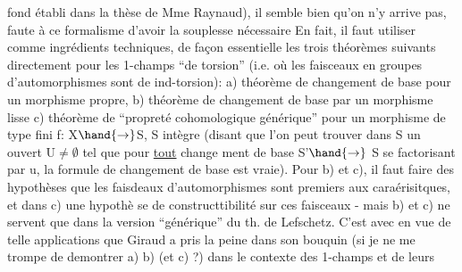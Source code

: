 fond établi dans la thèse de Mme Raynaud), il semble bien qu'on n'y arrive
 pas, faute  à ce formalisme d'avoir la souplesse nécessaire
En fait, il faut utiliser comme ingrédients techniques, de façon essentielle\hand{,}
les trois théorèmes suivants directement pour les 1-champs ``de torsion''
(i.e. où les faisceaux en groupes d'automorphismes sont de ind-torsion):
a) théorème de changement de base pour un morphisme propre, b) théorème de
changement de base par un morphisme lisse  c) théorème de  ``propreté
cohomologique générique'' pour un morphisme de type fini f: X$\hand{\to}$S, S intègre
(disant que l'on peut trouver dans S un ouvert U$\neq\emptyset$ tel que pour \uline{tout} change
ment de base S'$\hand{\to}$ S se factorisant par u, la formule de changement de base
est vraie). \hand{(}Pour b) et c), il faut faire des hypothèses que les faisdeaux
d'automorphismes sont premiers aux caraérisitques, et dans c) une hypothè
se de constructtibilité sur ces faisceaux - mais b) et c) ne servent que
dans la version ``générique'' du th. de Lefschetz.\hand{)} C'est avec en vue de telle
applications que Giraud a pris la peine dans son bouquin (si je ne me trompe\hand{)}
de demontrer a)\hand{,} b) (et c) ?) dans le contexte des 1-champs et de leurs

